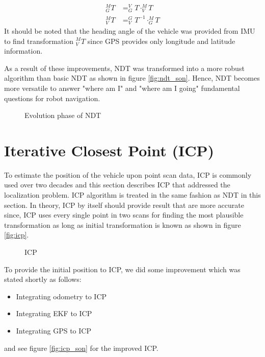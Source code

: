 \begin{align}
    _{G}^{M}T &= _{G}^{V}T \cdot _{V}^{M}T\\
    _{V}^{M}T &= _{V}^{G}T^{-1} \cdot _{G}^{M}T
\end{align}
It should be noted that the heading angle of the vehicle was provided from IMU to find transformation $_{V}^{M}T$ since GPS provides only longitude and latitude information.
\par As a result of these improvements, NDT was transformed into a more robust algorithm than basic NDT as shown in figure \ref{fig:ndt_son}. Hence, NDT becomes more versatile to answer "where am I" and "where am I going" fundamental questions for robot navigation. 
\vspace{-0,5cm}
\begin{figure}[H]
    \centering
    \hfill
    \caption{Evolution phase of NDT}
\end{figure}

\section{Iterative Closest Point (ICP)}
To estimate the position of the vehicle upon point scan data, ICP is commonly used over two decades and this section describes ICP that addressed the localization problem. ICP algorithm is treated in the same fashion as NDT in this section. In theory, ICP by itself should provide result that are more accurate since, ICP uses every single point in two scans for finding the most plausible transformation  as long as initial transformation is known as shown in figure \ref{fig:icp}. 
\vspace{-0.5cm}
\begin{figure}[H]
  \centering
  \hfill
    \caption{ICP}
\end{figure}
To provide the initial position to ICP, we did some improvement which was stated shortly as follows:
\begin{itemize}
    \item Integrating odometry to ICP
    \item Integrating EKF to ICP
    \item Integrating GPS to ICP
\end{itemize}
and see figure \ref{fig:icp_son} for the improved ICP.

